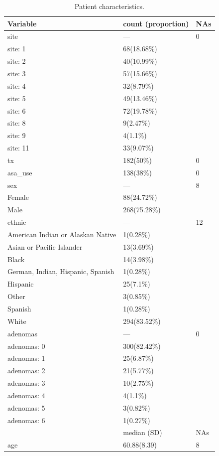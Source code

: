 \documentclass[paper=a4, fontsize=11pt]{scrartcl} %
\numberwithin{equation}{section} %
\numberwithin{figure}{section} %
\numberwithin{table}{section} %
\begin{document}
\begin{table}
\centering
\caption{Patient characteristics.}
\label{tab:characteristics}
\begin{tabular}{m{3cm} m{2cm} l}
  \hline
Variable & count (proportion) & NAs \\ 
  \hline
site & --- & 0 \\ 
  site: 1 & 68(18.68\%) &  \\ 
  site: 2 & 40(10.99\%) &  \\ 
  site: 3 & 57(15.66\%) &  \\ 
  site: 4 & 32(8.79\%) &  \\ 
  site: 5 & 49(13.46\%) &  \\ 
  site: 6 & 72(19.78\%) &  \\ 
  site: 8 & 9(2.47\%) &  \\ 
  site: 9 & 4(1.1\%) &  \\ 
  site: 11 & 33(9.07\%) &  \\ \hline
  tx & 182(50\%) & 0 \\ \hline
  asa\_use & 138(38\%) & 0 \\ \hline
  sex & --- & 8 \\ 
  Female & 88(24.72\%) &  \\ 
  Male & 268(75.28\%) &  \\ \hline
  ethnic & --- & 12 \\ 
  American Indian or Alaskan Native & 1(0.28\%) &  \\ 
  Asian or Pacific Islander & 13(3.69\%) &  \\ 
  Black & 14(3.98\%) &  \\ 
  German, Indian, Hispanic, Spanish & 1(0.28\%) &  \\ 
  Hispanic & 25(7.1\%) &  \\ 
  Other & 3(0.85\%) &  \\ 
  Spanish & 1(0.28\%) &  \\ 
  White & 294(83.52\%) &  \\ \hline
  adenomas & --- & 0 \\ 
  adenomas: 0 & 300(82.42\%) &  \\ 
  adenomas: 1 & 25(6.87\%) &  \\ 
  adenomas: 2 & 21(5.77\%) &  \\ 
  adenomas: 3 & 10(2.75\%) &  \\ 
  adenomas: 4 & 4(1.1\%) &  \\ 
  adenomas: 5 & 3(0.82\%) &  \\ 
  adenomas: 6 & 1(0.27\%) &  \\
    \hline
 & median (SD) & NAs \\ 
  \hline
age & 60.88(8.39) & 8 \\ 
   \hline
\end{tabular}
\end{table}
\end{document}
